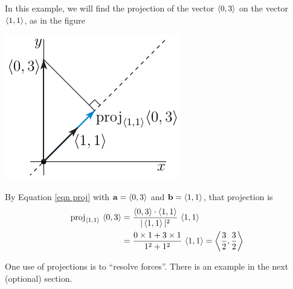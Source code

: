 \begin{eg}\label{eg proj}
In this example, we will find the projection of the vector $\left< 0,3\right>$
on the vector $\left< 1,1\right>$, as in the figure
      \begin{efig} 
      \begin{center}
      \includegraphics{projEg.pdf}
      \end{center}
      \end{efig}
By Equation \ref{eqn proj} with $\mathbf{a}=\left< 0,3\right>$ and $\mathbf{b}=\left< 1,1\right>$, 
that projection is
\begin{align*}
{\rm proj}_{\left< 1,1\right>}\,\left< 0,3\right>
  &=\frac{\left< 0,3\right>\cdot\left< 1,1\right>}{|\left< 1,1\right>|^2}\,\left< 1,1\right> \\
  &=\frac{0\times1+3\times 1}{1^2+1^2}\,\left< 1,1\right>
  =\left< \frac{3}{2},\frac{3}{2}\right>
\end{align*}

\end{eg}

One use of projections is to ``resolve forces''. There is an example in
the next (optional) section.

